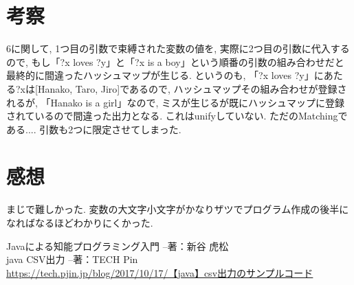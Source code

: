\documentclass[uplatex,12pt]{jsarticle}
\begin{document}
\section{考察}
6に関して, 1つ目の引数で束縛された変数の値を, 実際に2つ目の引数に代入するので, もし「?x loves ?y」と「?x is a boy」という順番の引数の組み合わせだと最終的に間違ったハッシュマップが生じる. というのも, 「?x loves ?y」にあたる?xは[Hanako, Taro, Jiro]であるので, ハッシュマップその組み合わせが登録されるが, 「Hanako is a girl」なので, ミスが生じるが既にハッシュマップに登録されているので間違った出力となる.
これはunifyしていない. ただのMatchingである....
引数も2つに限定させてしまった.


\section{感想}
まじで難しかった.
変数の大文字小文字がかなりザツでプログラム作成の後半になればなるほどわかりにくかった.

\begin{thebibliography}{99}
 Javaによる知能プログラミング入門 --著：新谷 虎松 \\
 java CSV出力 --著：TECH Pin \\
\url{https://tech.pjin.jp/blog/2017/10/17/【java】csv出力のサンプルコード}
\end{thebibliography}
\end{document}
